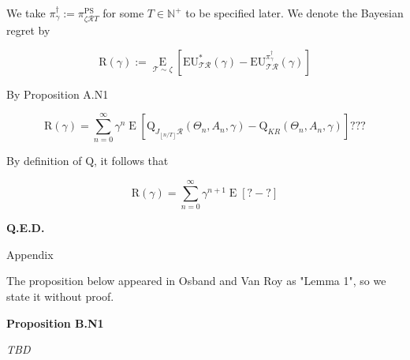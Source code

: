 \documentclass[a4paper]{article}
\newcommand{\Co}[1]{}
\DeclareMathOperator{\Supp}{supp}
\newcommand{\AP}[1]{\left(#1\right)}
\newcommand{\AB}[1]{\left[#1\right]}
\newcommand{\E}[1]{\underset{#1}{\operatorname{E}}}
\newcommand{\Ea}[2]{\underset{#1}{\operatorname{E}}\AB{#2}}
\newcommand{\D}{\mathrm{d}}
\newcommand{\Nats}{\mathbb{N}}
\newcommand{\Abs}[1]{\left\vert #1 \right\vert}
\newcommand{\Floor}[1]{\left\lfloor #1 \right\rfloor}
\newcommand{\K}{\xrightarrow{\mathrm{k}}}
\newcommand{\A}{\mathcal{A}}
\newcommand{\R}{\mathcal{R}}
\newcommand{\T}{\mathcal{T}}
\newcommand{\V}{\mathrm{V}}
\newcommand{\Q}{\mathrm{Q}}
\newcommand{\EU}{\mathrm{EU}}
\newcommand{\Reg}{\mathrm{R}}
\newcommand{\PSR}{\text{PS}}
\begin{document}
We take $\pi^\dagger_\gamma:=\pi^\PSR_{\zeta\R T}$ for some $T\in\Nats^+$ to be specified later. We denote the Bayesian regret by

$$\Reg(\gamma):=\Ea{\T\sim\zeta}{\EU^*_{\T\R}(\gamma)-\EU^{\pi_{\gamma}^{\dagger}}_{\T\R}(\gamma)}$$

By Proposition A.N1

$$\Reg(\gamma)=\sum_{n=0}^\infty\gamma^{n}\Ea{}{\Q_{J_{\Floor{n/T}}\R}\AP{\Theta_n,A_n,\gamma}-\Q_{KR}\AP{\Theta_n,A_n,\gamma}}???$$

By definition of $\Q$, it follows that

$$\Reg(\gamma)=\sum_{n=0}^\infty\gamma^{n+1}\Ea{}{?-?}$$


 
 


\textbf{Q.E.D.}\Co{b}

\begin{Huge}Appendix\end{Huge}

The proposition below appeared in Osband and Van Roy as "Lemma 1", so we state it without proof.

\textbf{Proposition B.N1}\Co{b}

\textit{TBD}\Co{i}

\Co{...

\textbf{Proposition B.N3}\Co{b}

Consider some $\gamma\in(0,1)$, $\tau\in(0,\infty)$, $T\in\Nats^+$, a universe..., some $\pi^*: ? \rightarrow \A$ and some $\pi^0: ? \K \A$. Assume that $\gamma \geq \gamma_M$. For any $n \in \Nats$, let $\pi^*_n$ be a policy s.t. for any $h \in ?$

$$\pi^*_n(h):=\begin{cases} \pi^0(h) \text{ if } \Abs{h} < nT \\ \pi^*(h) \text{ otherwise} \end{cases}$$

Assume that for any $h \in ?$

i. $$\pi^*(s) \in \A_{M}^\omega\AP{S(h)}$$

ii. $$\Supp{\pi^0(h)} \subseteq \A_{M}^0\AP{S(h)}$$

iii. For any $\theta\in(\gamma,1)$ $$\Abs{\frac{\D\V_{M}\AP{S(h),\theta}}{\D\theta}} \leq \tau$$

Then

$$\EU^{*}_\upsilon(\gamma)-\EU^{\pi^0}_\upsilon(\gamma) \leq (1-\gamma)\sum_{n=0}^\infty \sum_{m=0}^{T-1} \gamma^{nT+m}\left(\E{x\sim\mu\bowtie\pi^*_n}\left[r\left(x_{:nT+m}\right)\right]-\E{x\sim\mu\bowtie\pi^0}\left[r\left(x_{:nT+m}\right)\right]\right) + \frac{2\tau\gamma^T(1-\gamma)}{1-\gamma^T}$$}
\end{document}
